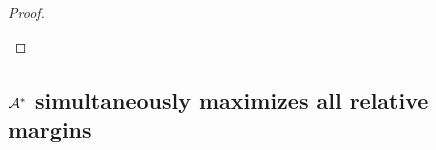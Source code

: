 \begin{proof}
\begin{description}[font=\normalfont\itshape\space]
    \end{description}
\end{proof}





\subsection{\texorpdfstring{$\mathcal{A}^*$}{The optimal adversary} simultaneously maximizes all relative margins}

